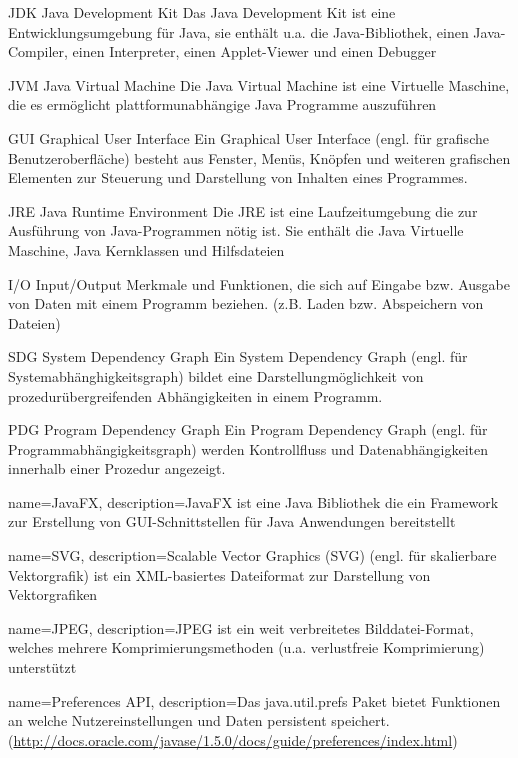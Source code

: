   {JDK}
  {Java Development Kit}
  {Das Java Development Kit ist eine Entwicklungsumgebung für Java, sie enthält u.a. die Java-Bibliothek, einen Java-Compiler, einen Interpreter, einen Applet-Viewer und einen Debugger}

  {JVM}
  {Java Virtual Machine}
  {Die Java Virtual Machine ist eine Virtuelle Maschine, die es ermöglicht plattformunabhängige Java Programme auszuführen}

  {GUI}
  {Graphical User Interface}
  {Ein Graphical User Interface (engl. für grafische Benutzeroberfläche) besteht aus Fenster, Menüs, Knöpfen und weiteren grafischen Elementen zur Steuerung und Darstellung von Inhalten eines Programmes.}

  {JRE}
  {Java Runtime Environment}
  {Die JRE ist eine Laufzeitumgebung die zur Ausführung von Java-Programmen nötig ist. Sie enthält die Java Virtuelle Maschine, Java Kernklassen und Hilfsdateien}

  {I/O}
  {Input/Output}
  {Merkmale und Funktionen, die sich auf Eingabe bzw. Ausgabe von Daten mit einem Programm beziehen. (z.B. Laden bzw. Abspeichern von Dateien)}

  {SDG}
  {System Dependency Graph}
  {Ein System Dependency Graph (engl. für Systemabhänghigkeitsgraph) bildet eine Darstellungmöglichkeit von prozedurübergreifenden Abhängigkeiten in einem Programm.}

  {PDG}
  {Program Dependency Graph}
  {Ein Program Dependency Graph (engl. für Programmabhängigkeitsgraph) werden Kontrollfluss und Datenabhängigkeiten innerhalb einer Prozedur angezeigt.}

{
  name=JavaFX,
  description={JavaFX ist eine Java Bibliothek die ein Framework zur Erstellung von GUI-Schnittstellen für Java Anwendungen bereitstellt}
}

{
  name=SVG,
  description={Scalable Vector Graphics (SVG) (engl. für skalierbare Vektorgrafik) ist ein XML-basiertes Dateiformat zur Darstellung von Vektorgrafiken}
}

{
  name=JPEG,
  description={JPEG ist ein weit verbreitetes Bilddatei-Format, welches mehrere Komprimierungsmethoden (u.a. verlustfreie Komprimierung) unterstützt}
}

{
  name=Preferences API,
  description={Das java.util.prefs Paket bietet Funktionen an welche Nutzereinstellungen und Daten persistent speichert. (\url{http://docs.oracle.com/javase/1.5.0/docs/guide/preferences/index.html})}
}

